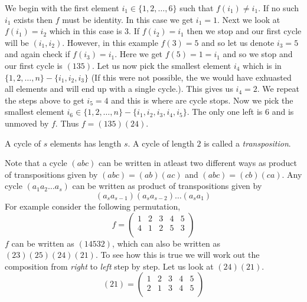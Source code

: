 We begin with the first element $i_1 \in \lbrace 1,2,\ldots,6\rbrace$ such that $f(i_1) \neq i_1$. If no such
$i_1$ exists then $f$ must be identity. 
In this case we get $i_1 = 1$. Next we look at $f(i_1) = i_2$ which in this case is $3$. If 
$f(i_2) = i_1$ then we stop and our first cycle will be $(i_1,i_2)$. However, in this example $f(3)
= 5$ and so let us denote $i_3 = 5$ and again check if $f(i_3) = i_1$. Here we get $f(5) = 1 = i_1$
and so we stop and our first cycle is $(135)$. Let us now pick the smallest element $i_4$ which is
in $\lbrace 1,2,\ldots,n \rbrace - \lbrace i_1,i_2,i_3\rbrace$ (If this were not possible, the we would have
exhuasted all elements and will end up with a single cycle.). This gives us $i_4 = 2$. We repeat the
steps above to get $i_5 = 4$ and this is where are cycle stops. Now we pick the smallest element
$i_6 \in \lbrace 1,2,\ldots,n\rbrace - \lbrace i_1,i_2,i_3,i_4,i_5 \rbrace$. The only one left is
$6$ and is unmoved by $f$. Thus $f = (135)(24)$. 
\begin{Definition}[name=Transposition]
    A cycle of $s$ elements has length $s$. A cycle of length $2$ is called a \emph{transposition}. 
\end{Definition}
Note that a cycle $(abc)$ can be written in atleast
two different ways as product of transpositions given by $(abc) = (ab)(ac)$ and $(abc) = (cb)(ca)$.
Any
cycle $(a_1 a_2 \ldots a_s)$ can be written as product of transpositions given by 
\begin{equation*}
    (a_s a_{s-1})(a_s a_{s-2})\ldots (a_{s}a_{1})
\end{equation*}
For example consider the following permutation,
\begin{equation*}
    f = 
 \begin{pmatrix}
  1 & 2 & 3 & 4 & 5  \\
  4 & 1 & 2 & 5 & 3  \\
 \end{pmatrix}
\end{equation*}
$f$ can be written as $(14532)$, which can also be written as $(23)(25)(24)(21)$. To see how this is
true we will work out the composition from \emph{right} to \emph{left} step by step.
Let us look at $(24)(21)$.
\begin{equation*}
    (21) = 
 \begin{pmatrix}
  1 & 2 & 3 & 4 & 5  \\
  2 & 1 & 3 & 4 & 5  \\
 \end{pmatrix}
\end{equation*}
